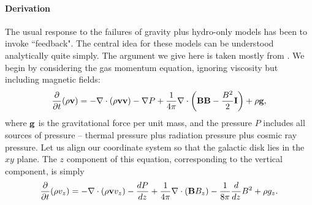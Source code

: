 \paragraph{Derivation}

The usual response to the failures of gravity plus hydro-only models has been to invoke ``feedback". The central idea for these models can be understood analytically quite simply. The argument we give here is taken mostly from \citet{ostriker11a}. We begin by considering the gas momentum equation, ignoring viscosity but including magnetic fields:
\begin{equation}
\frac{\partial}{\partial t} (\rho\mathbf{v}) = - \nabla\cdot (\rho\mathbf{v}\mathbf{v}) - \nabla P + \frac{1}{4\pi} \nabla \cdot \left(\mathbf{B}\mathbf{B} - \frac{B^2}{2} \mathbf{I}\right) + \rho \mathbf{g},
\end{equation}
where $\mathbf{g}$ is the gravitational force per unit mass, and the pressure $P$ includes all sources of pressure -- thermal pressure plus radiation pressure plus cosmic ray pressure. Let us align our coordinate system so that the galactic disk lies in the $xy$ plane. The $z$ component of this equation, corresponding to the vertical component, is simply
\begin{equation}
\frac{\partial}{\partial t} (\rho v_z) = - \nabla\cdot (\rho\mathbf{v} v_z) - \frac{dP}{dz} + \frac{1}{4\pi} \nabla \cdot \left(\mathbf{B} B_z\right) - \frac{1}{8\pi} \frac{d}{dz} B^2 + \rho g_z.
\end{equation}

